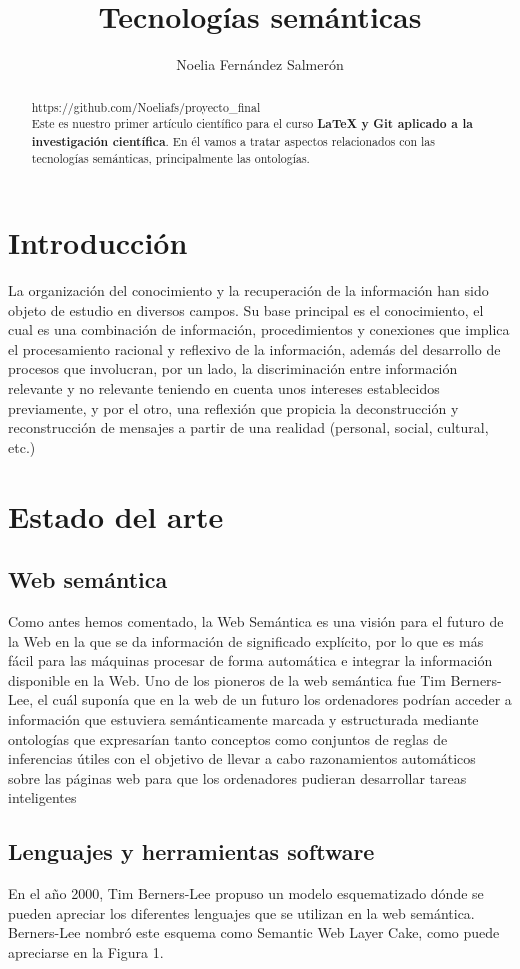 \documentclass{article}
\title{Tecnologías semánticas}
\author{Noelia Fernández Salmerón }
\begin{document}
\maketitle
\begin{abstract}
https://github.com/Noeliafs/proyecto\_final\\
Este es nuestro primer artículo científico para el curso {\bf LaTeX y Git aplicado a la investigación científica}. En él vamos a tratar aspectos relacionados con las tecnologías semánticas, principalmente las ontologías.
\end{abstract}
\section{Introducción}
La organización del conocimiento y la recuperación de la información han sido objeto de estudio en diversos campos. Su base principal es el conocimiento, el cual es una combinación de información, procedimientos y conexiones que implica el procesamiento racional y reflexivo de la información, además del desarrollo de procesos que involucran, por un lado, la discriminación entre información relevante y no relevante teniendo en cuenta unos intereses establecidos previamente, y por el otro, una reflexión que propicia la deconstrucción y reconstrucción de mensajes a partir de una
realidad (personal, social, cultural, etc.) 


\section{Estado del arte}
\subsection{Web semántica}
Como antes hemos comentado, la Web Semántica es una visión para el futuro de la Web en la que se da información de significado explícito, por lo que es más fácil para las máquinas procesar de forma automática e integrar la información disponible en la Web. Uno de los pioneros de la web semántica fue Tim Berners-Lee, el cuál suponía que en la web de un futuro los ordenadores podrían acceder a información que estuviera semánticamente marcada y estructurada mediante ontologías que expresarían tanto conceptos como conjuntos de reglas de inferencias útiles con el objetivo de llevar a cabo razonamientos automáticos sobre las páginas web para que los ordenadores pudieran desarrollar tareas inteligentes 

\subsection{Lenguajes y herramientas software}
En el año 2000, Tim Berners-Lee propuso un modelo esquematizado dónde se pueden apreciar los diferentes lenguajes que se utilizan en la web semántica. Berners-Lee nombró este esquema como Semantic Web Layer Cake, como puede apreciarse en la Figura 1.
\end{document}
